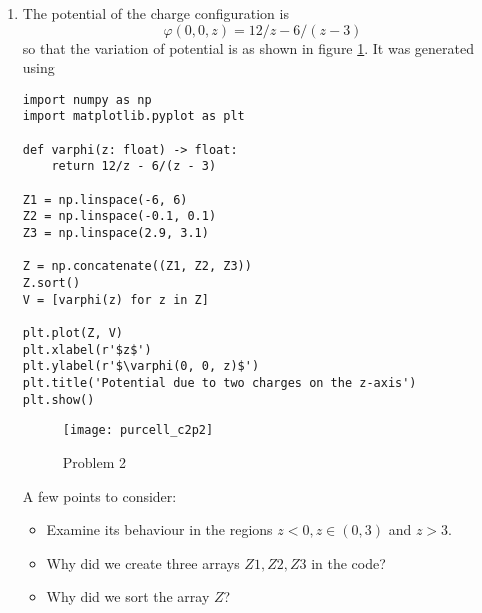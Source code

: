 \documentclass{article}
\begin{document}
\begin{enumerate}
\item The potential of the charge configuration is
\begin{equation}\label{e10}
\varphi(0, 0, z) = 12/z - 6/(z - 3)
\end{equation}
so that the variation of potential is as shown in figure \ref{c2f2}. It was 
generated using
\begin{verbatim}
import numpy as np
import matplotlib.pyplot as plt

def varphi(z: float) -> float:
    return 12/z - 6/(z - 3)
    
Z1 = np.linspace(-6, 6)
Z2 = np.linspace(-0.1, 0.1)
Z3 = np.linspace(2.9, 3.1)

Z = np.concatenate((Z1, Z2, Z3))
Z.sort()
V = [varphi(z) for z in Z]

plt.plot(Z, V)
plt.xlabel(r'$z$')
plt.ylabel(r'$\varphi(0, 0, z)$')
plt.title('Potential due to two charges on the z-axis')
plt.show()
\end{verbatim}
\begin{figure}[!ht]
\center
\texttt{[image: purcell\_c2p2]}
\caption{Problem 2}
\label{c2f2}
\end{figure}
A few points to consider:
\begin{itemize}
\item Examine its behaviour in the regions $z < 0, z \in (0, 3)$ and $z > 3$.
\item Why did we create three arrays $Z1, Z2, Z3$ in the code?
\item Why did we sort the array $Z$?
\end{itemize}


\end{enumerate}
\end{document}
